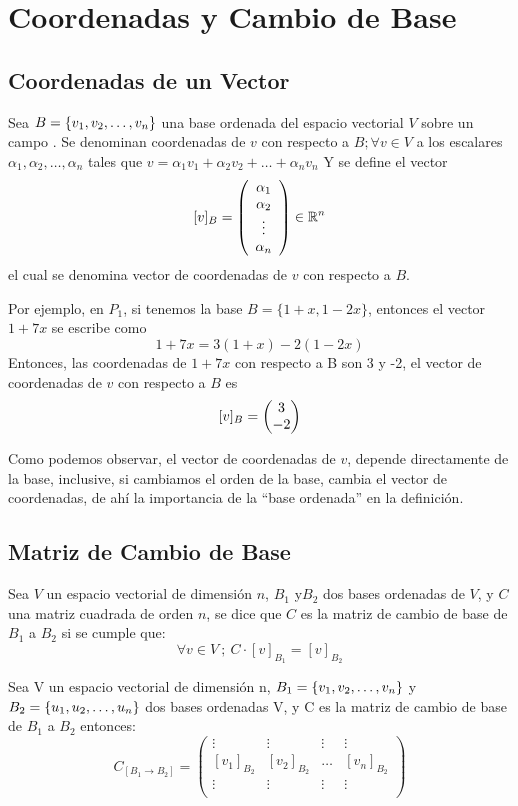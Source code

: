 
\chapter{Coordenadas y Cambio de Base}
\section{Coordenadas de un Vector}
\begin{dfn} 

Sea $B= \lbrace v_1, v_2, \ldots, v_n \rbrace$ una base ordenada del espacio vectorial $V$ sobre un campo \dobleK. Se denominan coordenadas de $v$ con respecto a $B; \forall v \in V$ a los escalares $\alpha _1,\alpha_2, \hdots, \alpha _n$ tales que
$v=\alpha_1 v_1+\alpha_2 v_2+ \hdots + \alpha_n v_n$
Y se define el vector $$[v]_B = \left( \begin{array}{c} \alpha_1\\ \alpha_2\\ \vdots\\ \alpha_n \end{array} \right)  \in  \mathbb{R}^n$$ el cual se denomina vector de coordenadas de $v$ con respecto a $B$. 
\end{dfn}

Por ejemplo, en $P_1$, si tenemos la base $B=\{1+x,1-2x\}$, entonces el vector $1+7x$ se escribe como
$$1+7x=3(1+x)-2(1-2x)$$
Entonces, las coordenadas de $1+7x$ con respecto a B son 3 y -2, el vector de coordenadas de $v$ con respecto a $B$ es $$[v]_B=\begin{pmatrix} 3\\ -2\\ \end{pmatrix} $$

Como podemos observar, el vector de coordenadas de $v$, depende directamente de la base, inclusive, si cambiamos el orden de la base, cambia el vector de coordenadas, de ahí la importancia de la “base ordenada” en la definición.

\section{Matriz de Cambio de Base}
\begin{dfn} Sea $V$ un espacio vectorial de dimensión $n$, $ B_1$  y$ B_2$  dos bases ordenadas de $V$, y $C$ una matriz cuadrada de orden $n$, se dice que $C$ es la matriz de cambio de base de $B_1$ a $B_2$ si se cumple que:
$$\forall v \in V \ ; \ C\cdot [v]_{B_1}= [v]_{B_2}$$
\end{dfn}

\begin{theorem}


Sea V un espacio vectorial de dimensión n, $B_1= \lbrace v_1, v_2, \ldots, v_n \rbrace$  y $B_2= \lbrace u_1, u_2, \ldots, u_n \rbrace$  dos bases ordenadas V, y C es la matriz de cambio de base de $B_1$ a $B_2$ entonces:
\[C_{[B_1 \rightarrow B_2]}= \begin{pmatrix}
\vdots & \vdots & \vdots & \vdots\\
\left[v_1\right]_{B_2}&\left[v_2\right]_{B_2}& \hdots & \left[v_n\right]_{B_2}\\
\vdots & \vdots & \vdots & \vdots\\
\end{pmatrix}\]
\end{theorem}

